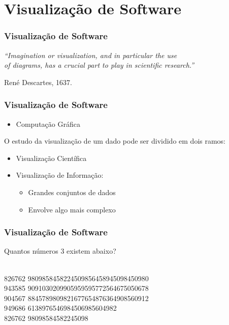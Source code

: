 \documentclass{beamer}
\begin{document}
\section{Visualização de Software} %

\begin{frame}
\frametitle{Visualização de Software}
\center
\textit{“Imagination or visualization, and in particular the use \\
of diagrams, has a crucial part to play in scientific research.”} \\
\centerline{René Descartes, 1637.}
\end{frame}


\begin{frame}
\frametitle{Visualização de Software}

\begin{itemize}
\item Computação Gráfica
\end{itemize}

O estudo da visualização de um dado pode ser dividido em dois ramos:
\begin{itemize}
\item Visualização Científica
\item Visualização de Informação:
\begin{itemize}
\item Grandes conjuntos de dados
\item Envolve algo mais complexo
\end{itemize}
\end{itemize}
\end{frame}


\begin{frame}
\frametitle{Visualização de Software}
\center Quantos números 3 existem abaixo?

 \\
826762 9809858458224509856458945098450980 \\
943585 9091030209905959595772564675050678 \\
904567 8845789809821677654876364908560912 \\
949686 6138976546984506985604982 \\
826762 98098584582245098 \\

\end{frame}
\end{document}
